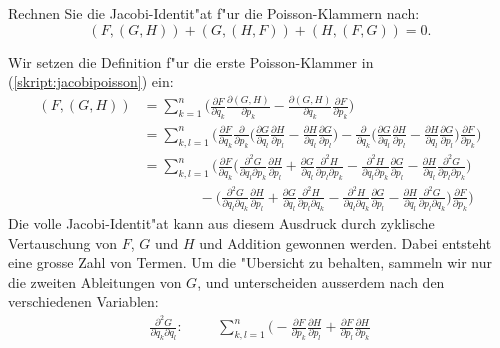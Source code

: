 Rechnen Sie die Jacobi-Identit"at f"ur die Poisson-Klammern nach:
\begin{equation}
(F,(G,H))+ (G,(H,F))+ (H,(F,G))=0.
\label{skript:jacobipoisson}
\end{equation}

\begin{loesung}
Wir setzen die Definition f"ur die erste Poisson-Klammer in
(\ref{skript:jacobipoisson}) ein:
\begin{align*}
(F,(G,H))
&=
\sum_{k=1}^n\biggl(
\frac{\partial F}{\partial q_k} \frac{\partial (G,H)}{\partial p_k}
-
\frac{\partial (G,H)}{\partial q_k} \frac{\partial F}{\partial p_k}
\biggr)
\\
&=
\sum_{k,l=1}^n\biggl(
\frac{\partial F}{\partial q_k}
\frac{\partial}{\partial p_k}\biggl(
\frac{\partial G}{\partial q_l}\frac{\partial H}{\partial p_l}
-
\frac{\partial H}{\partial q_l}\frac{\partial G}{\partial p_l}
\biggr)
-
\frac{\partial}{\partial q_k}\biggl(
\frac{\partial G}{\partial q_l}\frac{\partial H}{\partial p_l}
-
\frac{\partial H}{\partial q_l}\frac{\partial G}{\partial p_l}
\biggr)
\frac{\partial F}{\partial p_k}
\biggr)
\\
&=
\sum_{k,l=1}^n\biggl(
\frac{\partial F}{\partial q_k}
\biggl(
\frac{\partial^2 G}{\partial q_l\partial p_k}\frac{\partial H}{\partial p_l}
+
\frac{\partial G}{\partial q_l}\frac{\partial^2 H}{\partial p_l\partial p_k}
-
\frac{\partial^2 H}{\partial q_l\partial p_k}\frac{\partial G}{\partial p_l}
-
\frac{\partial H}{\partial q_l}\frac{\partial^2 G}{\partial p_l\partial p_k}
\biggr)
\\
&\qquad\qquad
-
\biggl(
\frac{\partial^2 G}{\partial q_l\partial q_k}\frac{\partial H}{\partial p_l}
+
\frac{\partial G}{\partial q_l}\frac{\partial^2 H}{\partial p_l\partial q_k}
-
\frac{\partial^2 H}{\partial q_l\partial q_k}\frac{\partial G}{\partial p_l}
-
\frac{\partial H}{\partial q_l}\frac{\partial^2 G}{\partial p_l\partial q_k}
\biggr)
\frac{\partial F}{\partial p_k}
\biggr)
\end{align*}
Die volle Jacobi-Identit"at kann aus diesem Ausdruck durch zyklische
Vertauschung von $F$, $G$ und $H$ und Addition gewonnen werden.
Dabei entsteht eine grosse Zahl von Termen.
Um die "Ubersicht zu behalten, sammeln wir nur die zweiten Ableitungen
von $G$,
und unterscheiden ausserdem nach den verschiedenen Variablen:
\begin{align*}
\frac{\partial^2 G}{\partial q_k\partial q_l}:&
&&
\sum_{k,l=1}^n
\biggl(
-\frac{\partial F}{\partial p_k} \frac{\partial H}{\partial p_l}
+\frac{\partial F}{\partial p_l} \frac{\partial H}{\partial p_k}

\end{align*}
\end{loesung}
